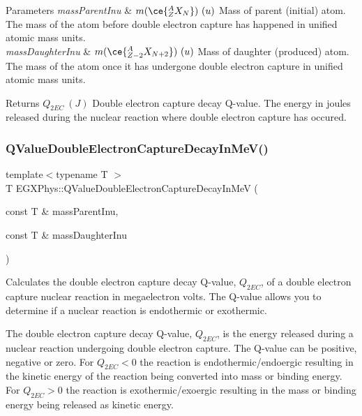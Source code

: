\begin{DoxyParams}{Parameters}
{\em mass\+Parent\+Inu} & $m(\ce{ ^{A}_{Z}X_{N} })\ (u)$ Mass of parent (initial) atom. The mass of the atom before double electron capture has happened in unified atomic mass units. \\
\hline
{\em mass\+Daughter\+Inu} & $m(\ce{ ^{A}_{Z-2}X_{N{+2}} })\ (u)$ Mass of daughter (produced) atom. The mass of the atom once it has undergone double electron capture in unified atomic mass units. \\
\hline
\end{DoxyParams}
\begin{DoxyReturn}{Returns}
$Q_{2EC}\ (J)$ Double electron capture decay Q-\/value. The energy in joules released during the nuclear reaction where double electron capture has occured. 
\end{DoxyReturn}
\mbox{\label{group___q_value_ga93e5774784c0d9551e46ba19e1dbc9ab}} 
\subsubsection{\texorpdfstring{Q\+Value\+Double\+Electron\+Capture\+Decay\+In\+Me\+V()}{QValueDoubleElectronCaptureDecayInMeV()}}
{\footnotesize\ttfamily template$<$typename T $>$ \\
T E\+G\+X\+Phys\+::\+Q\+Value\+Double\+Electron\+Capture\+Decay\+In\+MeV (\begin{DoxyParamCaption}\item[{const T \&}]{mass\+Parent\+Inu,  }\item[{const T \&}]{mass\+Daughter\+Inu }\end{DoxyParamCaption})}



Calculates the double electron capture decay Q-\/value, $Q_{2EC}$, of a double electron capture nuclear reaction in megaelectron volts. The Q-\/value allows you to determine if a nuclear reaction is endothermic or exothermic. 

The double electron capture decay Q-\/value, $Q_{2EC}$, is the energy released during a nuclear reaction undergoing double electron capture. The Q-\/value can be positive, negative or zero. For $Q_{2EC} < 0$ the reaction is endothermic/endoergic resulting in the kinetic energy of the reaction being converted into mass or binding energy. For $Q_{2EC} > 0$ the reaction is exothermic/exoergic resulting in the mass or binding energy being released as kinetic energy.

